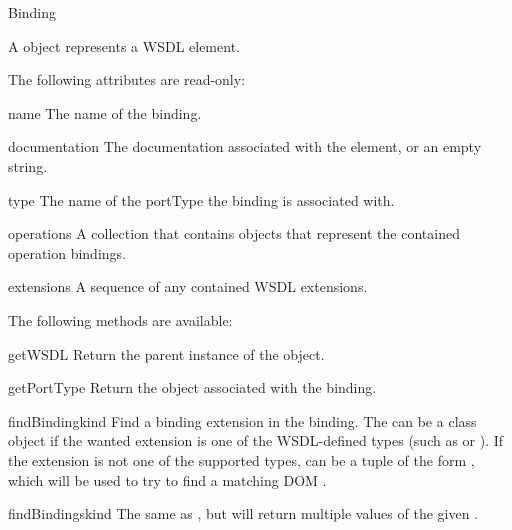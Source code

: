 \begin{classdesc}{Binding}{}

A  object represents a WSDL  element.

The following attributes are read-only:

\begin{memberdesc}{name}
The name of the binding.
\end{memberdesc}

\begin{memberdesc}{documentation}
The documentation associated with the element, or an empty string.
\end{memberdesc}

\begin{memberdesc}{type}
The name of the portType the binding is associated with.
\end{memberdesc}

\begin{memberdesc}{operations}
A collection that contains  objects that represent 
the contained operation bindings.
\end{memberdesc}

\begin{memberdesc}{extensions}
A sequence of any contained WSDL extensions.
\end{memberdesc}

The following methods are available:

\begin{methoddesc}{getWSDL}{}
Return the parent  instance of the object.
\end{methoddesc}

\begin{methoddesc}{getPortType}{}
Return the  object associated with the binding.
\end{methoddesc}

\begin{methoddesc}{findBinding}{kind}
Find a binding extension in the binding. The  can be a class 
object if the wanted extension is one of the WSDL-defined types (such as 
 or ). If the extension is not one of 
the supported types,  can be a tuple of the form 
, which will be used to try to find a 
matching DOM .
\end{methoddesc}

\begin{methoddesc}{findBindings}{kind}
The same as , but will return multiple values of 
the given .
\end{methoddesc}

\end{classdesc}

